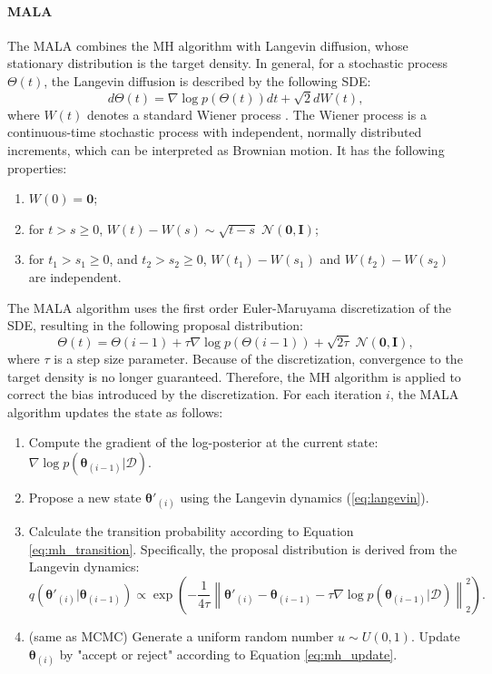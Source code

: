 \paragraph{\acf{MALA}}\label{sec:MALA}
The \ac{MALA} \citep{besag2004markov} combines the \ac{MH} algorithm with Langevin diffusion, whose stationary distribution is the target density. In general, for a stochastic process $\Theta(t)$, the Langevin diffusion is described by the following \ac{SDE}:
\begin{equation}
d\Theta(t)=\nabla \log p(\Theta(t))dt + \sqrt{2} dW(t),
\end{equation}
where $W(t)$ denotes a standard Wiener process \citep{gabbiani2010mathematics}. The Wiener process is a continuous-time stochastic process with independent, normally distributed increments, which can be interpreted as Brownian motion. It has the following properties:
\begin{enumerate}
    \item [(1)] $W(0)=\boldsymbol{0}$;
    \item [(2)] for $t > s \geq 0 $, $W(t)-W(s)\sim\sqrt{t-s}\;\mathcal{N}(\boldsymbol{0}, \boldsymbol{I})$;
    \item [(3)] for $t_1>s_1\geq 0$, and $t_2>s_2\geq 0$, $W(t_1)-W(s_1)$ and $W(t_2)-W(s_2)$ are independent. 
\end{enumerate}                 
The \ac{MALA} algorithm uses the first order Euler-Maruyama discretization of the \ac{SDE}, resulting in the following proposal distribution:
\begin{equation}
    \label{eq:langevin}
    \Theta(t) = \Theta(i-1) + \tau \nabla \log p(\Theta(i-1)) + \sqrt{2\tau}\; \mathcal{N}(\boldsymbol{0}, \boldsymbol{I}),
\end{equation}
where $\tau$ is a step size parameter.
Because of the discretization, convergence to the target density is no longer guaranteed. Therefore, the \ac{MH} algorithm is applied to correct the bias introduced by the discretization. 
For each iteration $i$, the \ac{MALA} algorithm updates the state as follows:
\begin{enumerate}
    \item[(a)] Compute the gradient of the log-posterior at the current state: $\nabla \log p(\boldsymbol{\theta}_{(i-1)}|\mathcal{D})$.
    \item[(b)] Propose a new state $\boldsymbol{\theta}'_{(i)}$ using the Langevin dynamics (\ref{eq:langevin}).
    \item[(c)] Calculate the transition probability according to Equation \ref{eq:mh_transition}. Specifically, the proposal distribution is derived from the Langevin dynamics:
    \begin{equation}
        q(\boldsymbol{\theta}'_{(i)}|\boldsymbol{\theta}_{(i-1)})\propto \exp(-\frac{1}{4\tau}\left\|\boldsymbol{\theta}'_{(i)}-\boldsymbol{\theta}_{(i-1)}-\tau\nabla\log p(\boldsymbol{\theta}_{(i-1)}|\mathcal{D})\right\|^2_2).
    \end{equation}
    \item[(d)] (same as MCMC) Generate a uniform random number $u \sim U(0,1)$. Update $\boldsymbol{\theta}_{(i)}$ by "accept or reject" according to Equation \ref{eq:mh_update}. 
\end{enumerate}

